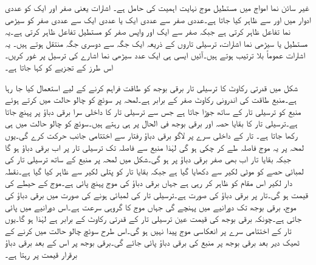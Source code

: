 غیر سائن نما امواج میں مستطیل موج نہایت اہمیت کی حامل ہے۔ اشارات یعنی صفر اور  ایک  کو عددی ادوار  میں  اور  سے ظاہر کیا جاتا ہے۔عددی صفر سے عددی ایک یا عددی ایک سے عددی صفر کو سیڑھی نما تفاعل ظاہر کرتی ہے جبکہ صفر سے ایک اور واپس صفر کو مستطیل تفاعل ظاہر کرتی ہے۔یہ مستطیل یا سیڑھی نما اشارات، ترسیلی تاروں کے ذریعہ ایک جگہ سے دوسری جگہ منتقل ہوتے ہیں۔ یہ اشارات عموماً بلا ترتیب ہوتے ہیں۔آئیں ایسی ہی ایک عدد سیڑھی نما اشارے کی ترسیل پر غور کریں۔ اس طرز کے تجزیے کو  کہا جاتا ہے۔

 شکل  میں  قدرتی رکاوٹ کا ترسیلی تار  برقی بوجھ کو طاقت فراہم کرنے کے لیے استعمال کیا جا رہا ہے۔منبع طاقت کی اندرونی رکاوٹ صفر کے برابر ہے۔لمحہ  پر سوئچ کو چالو حالت میں کرتے ہوئے منبع کو ترسیلی تار کے ساتھ جوڑا جاتا ہے جس سے ترسیلی تار کا داخلی سرا  برقی دباؤ پر پہنچ جاتا ہے۔ترسیلی تار کا بقایا حصہ اور برقی بوجھ فی الحال  پر ہی رہتے ہیں۔سوئچ کو چالو حالت میں ہی رکھا جاتا ہے۔ تار کے داخلی سرے پر لاگو برقی دباؤ رفتار  سے اختتامی جانب حرکت کرے گی۔یوں لمحہ  پر یہ موج  فاصلہ طے کر چکی ہو گی لہٰذا منبع سے فاصلہ  تک ترسیلی تار پر اب برقی دباؤ  ہو گا جبکہ بقایا تار اب بھی صفر برقی دباؤ پر ہو گی۔شکل  میں لمحہ  پر منبع کے ساتھ ترسیلی تار کی  لمبائی حصے کو موٹی لکیر سے دکھایا گیا ہے جبکہ بقایا تار کو پتلی لکیر سے ظاہر کیا گیا ہے۔نقطہ دار لکیر اس مقام کو ظاہر کر رہی ہے جہاں برقی دباؤ کی موج   پہنچ پائی ہے۔موج کے حیطے کی قیمت   ہو گی۔تار پر برقی دباؤ کی صورت  ہے۔ترسیلی تار کی لمبائی  ہونے کی صورت میں برقی دباؤ کی موج،  برقی بوجھ تک  دورانیے میں پہنچے گی جہاں  موج کا  گروہی سرعت ہے۔اس دورانیے میں  پائی جاتی ہے۔چونکہ برقی بوجھ کی قیمت عین ترسیلی تار کے قدرتی رکاوٹ کے  برابر ہے لہٰذا  ہو گا۔یوں تار کے اختتامی سرے پر انعکاسی موج پیدا نہیں ہو گی۔اس طرح سوئچ چالو حالت میں کرنے کے ٹھیک   دیر بعد برقی بوجھ پر منبع کی برقی دباؤ  پائی جائے گی۔برقی بوجھ پر اس کے بعد برقی دباؤ برقرار  قیمت پر رہتا ہے۔

